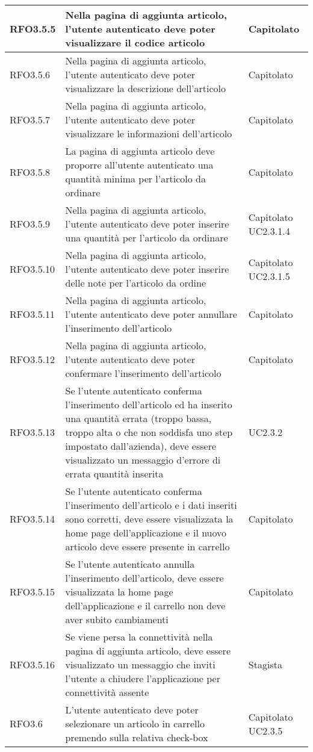 {\begin{center}
\begin{longtable}{ | >{\centering\arraybackslash}p{2.5cm} | >{\arraybackslash}p{7cm} | >{\centering\arraybackslash}p{2cm} | }
RFO3.5.5 & Nella pagina di aggiunta articolo, l'utente autenticato deve poter visualizzare il codice articolo & Capitolato \\ \hline
RFO3.5.6 & Nella pagina di aggiunta articolo, l'utente autenticato deve poter visualizzare la descrizione dell'articolo & Capitolato \\ \hline
RFO3.5.7 & Nella pagina di aggiunta articolo, l'utente autenticato deve poter visualizzare le informazioni dell'articolo & Capitolato \\ \hline
RFO3.5.8 & La pagina di aggiunta articolo deve proporre all'utente autenticato una quantità minima per l'articolo da ordinare & Capitolato \\ \hline
RFO3.5.9 & Nella pagina di aggiunta articolo, l'utente autenticato deve poter inserire una quantità per l'articolo da ordinare & Capitolato UC2.3.1.4 \\ \hline
RFO3.5.10 & Nella pagina di aggiunta articolo, l'utente autenticato deve poter inserire delle note per l'articolo da ordine & Capitolato UC2.3.1.5\\ \hline
RFO3.5.11 & Nella pagina di aggiunta articolo, l'utente autenticato deve poter annullare l'inserimento dell'articolo & Capitolato \\ \hline
RFO3.5.12 & Nella pagina di aggiunta articolo, l'utente autenticato deve poter confermare l'inserimento dell'articolo & Capitolato \\ \hline
RFO3.5.13 & Se l'utente autenticato conferma l'inserimento dell'articolo ed ha inserito una quantità errata (troppo bassa, troppo alta o che non soddisfa uno step impostato dall'azienda), deve essere visualizzato un messaggio d'errore di errata quantità inserita & UC2.3.2 \\ \hline
RFO3.5.14 & Se l'utente autenticato conferma l'inserimento dell'articolo e i dati inseriti sono corretti, deve essere visualizzata la home page dell'applicazione e il nuovo articolo deve essere presente in carrello & Capitolato \\ \hline
RFO3.5.15 & Se l'utente autenticato annulla l'inserimento dell'articolo, deve essere visualizzata la home page dell'applicazione e il carrello non deve aver subito cambiamenti & Capitolato \\ \hline
RFO3.5.16 & Se viene persa la connettività nella pagina di aggiunta articolo, deve essere visualizzato un messaggio che inviti l'utente a chiudere l'applicazione per connettività assente & Stagista \\ \hline
RFO3.6 & L'utente autenticato deve poter selezionare un articolo in carrello premendo sulla relativa check-box & Capitolato UC2.3.5\\ \hline

\end{longtable}
\end{center}}

